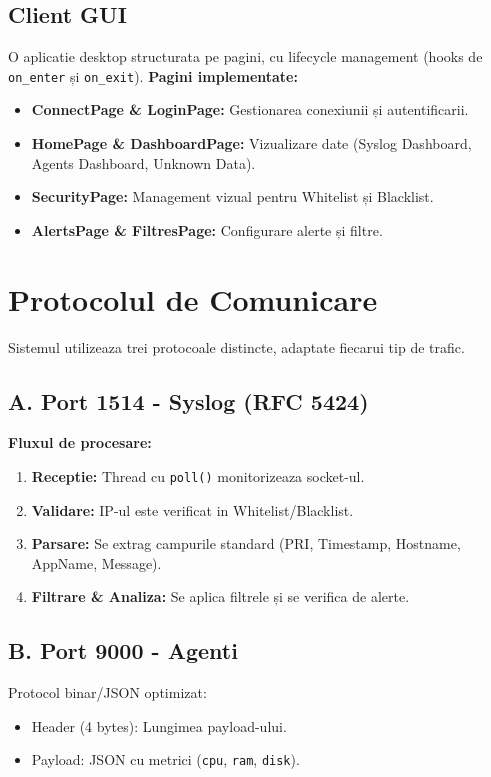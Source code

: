\documentclass[runningheads]{llncs}
\begin{document}
\subsection{Client GUI}
O aplicatie desktop structurata pe pagini, cu lifecycle management (hooks de \texttt{on\_enter} și \texttt{on\_exit}).
\textbf{Pagini implementate:}
\begin{itemize}
    \item \textbf{ConnectPage \& LoginPage:} Gestionarea conexiunii și autentificarii.
    \item \textbf{HomePage \& DashboardPage:} Vizualizare date (Syslog Dashboard, Agents Dashboard, Unknown Data).
    \item \textbf{SecurityPage:} Management vizual pentru Whitelist și Blacklist.
    \item \textbf{AlertsPage \& FiltresPage:} Configurare alerte și filtre.
\end{itemize}

\section{Protocolul de Comunicare}

Sistemul utilizeaza trei protocoale distincte, adaptate fiecarui tip de trafic.

\subsection{A. Port 1514 - Syslog (RFC 5424)}
\textbf{Fluxul de procesare:}
\begin{enumerate}
    \item \textbf{Receptie:} Thread cu \texttt{poll()} monitorizeaza socket-ul.
    \item \textbf{Validare:} IP-ul este verificat in Whitelist/Blacklist.
    \item \textbf{Parsare:} Se extrag campurile standard (PRI, Timestamp, Hostname, AppName, Message).
    \item \textbf{Filtrare \& Analiza:} Se aplica filtrele și se verifica de alerte.
\end{enumerate}

\subsection{B. Port 9000 - Agenti}
Protocol binar/JSON optimizat:
\begin{itemize}
    \item Header (4 bytes): Lungimea payload-ului.
    \item Payload: JSON cu metrici (\texttt{cpu}, \texttt{ram}, \texttt{disk}).
\end{itemize}
\end{document}
